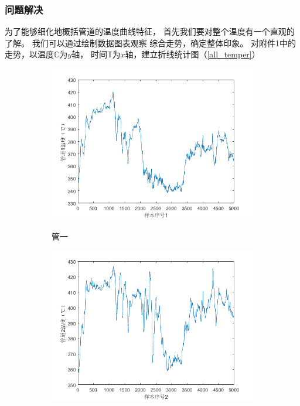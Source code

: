         \subsubsection{问题解决}
        为了能够细化地概括管道的温度曲线特征，
        首先我们要对整个温度有一个直观的了解。
        我们可以通过绘制数据图表观察
        综合走势，确定整体印象。
        对附件1中的走势，以温度$\mathbb{C}$为$y$轴，
        时间$\mathbb{T}$为$x$轴，建立折线统计图（\ref{all_temper}）
        \begin{figure}
            \centering
            \begin{subfigure}{0.32\textwidth}
                \includegraphics[width=\textwidth]{figures/p1_1.png}
                \label{p1_1}
                \caption{管一}
            \end{subfigure}
            \begin{subfigure}{0.32\textwidth}
                \includegraphics[width=\textwidth]{figures/p1_2.png}

\end{subfigure}
\end{figure}
